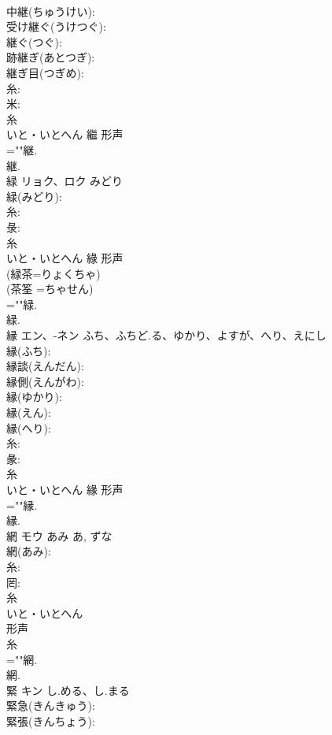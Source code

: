 \documentclass[8pt]{extreport}
\begin{document}
\begin{CJK}{UTF8}{min}
\\	中継(ちゅうけい): 
\\	受け継ぐ(うけつぐ): 
\\	継ぐ(つぐ): 
\\	跡継ぎ(あとつぎ): 
\\	継ぎ目(つぎめ): 
\\	糸: 
\\	米: 
\\	糸	
\\	いと・いとへん	繼	形声 
\\	=""継.
\\	継.
\\	緑	リョク、ロク	みどり		
\\	緑(みどり): 
\\	糸: 
\\	彔: 
\\	糸	
\\	いと・いとへん	綠	形声 
\\	(緑茶=りょくちゃ) 
\\	(茶筌 =ちゃせん) 
\\	=""緑.
\\	緑.
\\	縁	エン、-ネン	ふち、ふちど.る、ゆかり、よすが、へり、えにし		
\\	縁(ふち): 
\\	縁談(えんだん): 
\\	縁側(えんがわ): 
\\	縁(ゆかり): 
\\	縁(えん): 
\\	縁(へり): 
\\	糸: 
\\	彖: 
\\	糸	
\\	いと・いとへん	緣	形声 
\\	=""縁.
\\	縁.
\\	網	モウ	あみ	あ, ずな	
\\	網(あみ): 
\\	糸: 
\\	罔: 
\\	糸	
\\	いと・いとへん	
\\	形声 
\\	糸 
\\	=""網.
\\	網.
\\	緊	キン	し.める、し.まる		
\\	緊急(きんきゅう): 
\\	緊張(きんちょう): 

\end{CJK}
\end{document}
